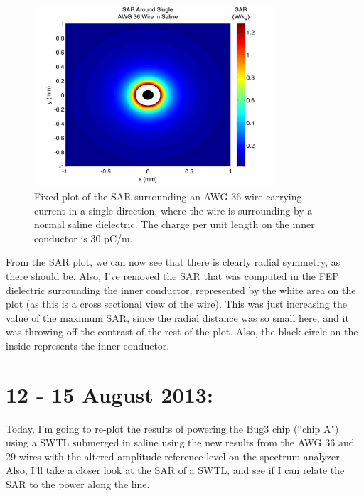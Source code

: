 \documentclass[12pt,onecolumn,titlepage]{article}
\begin{document}
\begin{figure}[htbp]
	\centering
	\includegraphics[width=0.8\textwidth]{Pictures/9Aug2013/SAR_single_wire_nonTx_AWG36_saline}
	\caption{ Fixed plot of the SAR surrounding an AWG 36 wire carrying current in a single direction, where the wire is surrounding by a normal saline dielectric. The charge per unit length on the inner conductor is 30 pC/m. } 
	\label{fig:SAR_single_wire_nonTx_AWG36_saline}
\end{figure}



From the SAR plot, we can now see that there is clearly radial symmetry, as there should be. Also, I've removed the SAR that was computed in the FEP dielectric surrounding the inner conductor, represented by the white area on the plot (as this is a cross sectional view of the wire). This was just increasing the value of the maximum SAR, since the radial distance was so small here, and it was throwing off the contrast of the rest of the plot. Also, the black circle on the inside represents the inner conductor.




\clearpage
\section{12 - 15 August 2013:}

\indent \indent Today, I'm going to re-plot the results of powering the Bug3 chip (``chip A") using a SWTL submerged in saline using the new results from the AWG 36 and 29 wires with the altered amplitude reference level on the spectrum analyzer. Also, I'll take a closer look at the SAR of a SWTL, and see if I can relate the SAR to the power along the line.
\end{document}
